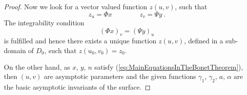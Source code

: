 \documentclass[10pt,a4paper]{amsart}
\begin{document}
\begin{proof}
Now we look for a vector valued function $z(u,v)$, such that
$$
	z_u=\Phi x  \qquad\qquad z_v=\Psi y \ .
$$
The integrability condition 
$$
	(\Phi x)_v=(\Psi y)_u 
$$
is fulfilled and hence there exists a unique function $z(u,v)$, 
defined in a sub-domain of $D_0$, such that $z(u_0,v_0)=z_0$.

On the other hand, as  $x$, $y$, $n$ satisfy (\ref{eq:MainEquationsInTheBonetTheorem}), 
then  $(u,v)$ are asymptotic parameters and the given functions 
$\gamma_1$, $\gamma_2$, $a$, $\alpha$ are the basic asymptotic invariants
of the surface. 

\end{proof}
\end{document}
